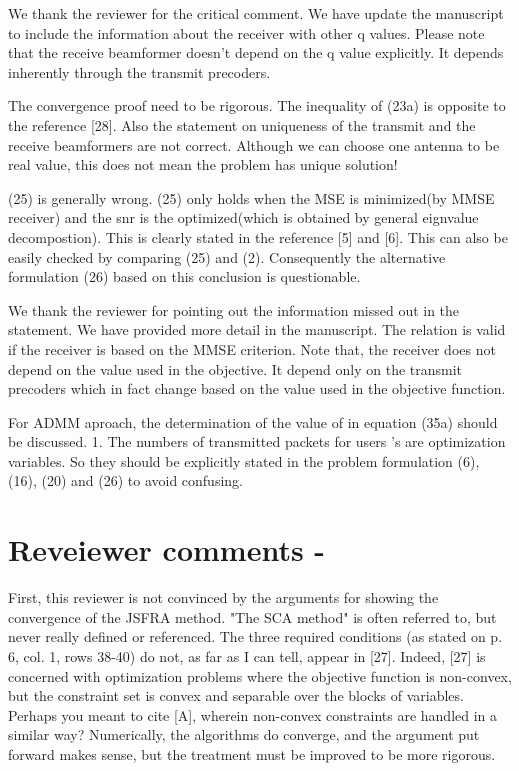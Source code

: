 \resp We thank the reviewer for the critical comment. We have update the manuscript to include the information about the receiver with other q values. Please note that the receive beamformer doesn't depend on the q value explicitly. It depends inherently through the transmit precoders.

 The convergence proof need to be rigorous. The inequality of (23a) is opposite to the reference [28]. Also the statement on uniqueness of the transmit and the receive beamformers are not correct. Although we can choose one antenna to be real value, this does not mean the problem has unique solution!

 (25) is generally wrong. (25) only holds when the MSE is minimized(by MMSE receiver) and the snr is the optimized(which is obtained by general eignvalue decompostion). This is clearly stated in the reference [5] and [6]. This can also be easily checked by comparing (25) and (2). Consequently the alternative formulation (26) based on this conclusion is questionable.

\resp We thank the reviewer for pointing out the information missed out in the statement. We have provided more detail in the manuscript. The relation is valid if the receiver is based on the MMSE criterion. Note that, the receiver does not depend on the  value used in the objective. It depend only on the transmit precoders which in fact change based on the  value used in the objective function. 

 For ADMM aproach, the determination of the value of \me{\rho} in equation (35a) should be discussed. 1. The numbers of transmitted packets for users  's are optimization variables. So they should be explicitly stated in the problem formulation (6), (16), (20) and (26) to avoid confusing.

\section*{Reveiewer comments - }

 First, this reviewer is not convinced by the arguments for showing the convergence of the JSFRA method. "The SCA method" is often referred to, but never really defined or referenced. The three required conditions (as stated on p. 6, col. 1, rows 38-40) do not, as far as I can tell, appear in [27]. Indeed, [27] is concerned with optimization problems where the objective function is non-convex, but the constraint set is convex and separable over the blocks of variables. Perhaps you meant to cite [A], wherein non-convex constraints are handled in a similar way? Numerically, the algorithms do converge, and the argument put forward makes sense, but the treatment must be improved to be more rigorous.

